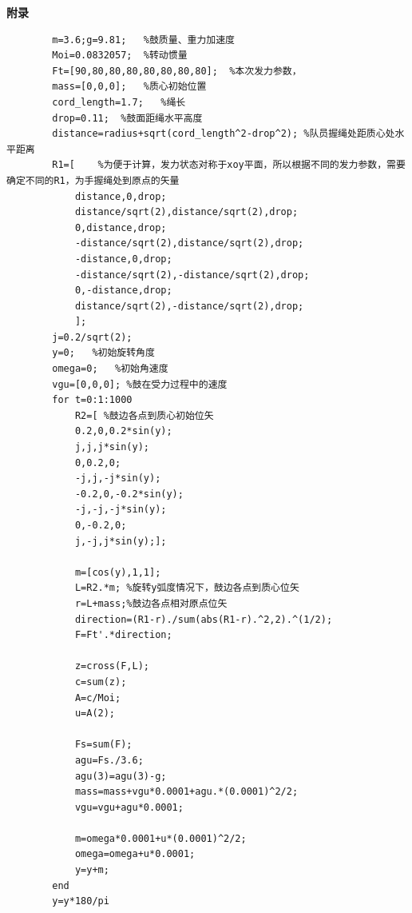 \documentclass[UTF8]{article}
\begin{document}
\newpage
\begin{appendices}
\centerline{{\LARGE\bfseries 附录}}

\centerline{\songti{}}
    \begin{verbatim}
        m=3.6;g=9.81;   %鼓质量、重力加速度
        Moi=0.0832057;  %转动惯量
        Ft=[90,80,80,80,80,80,80,80];  %本次发力参数，
        mass=[0,0,0];   %质心初始位置
        cord_length=1.7;   %绳长
        drop=0.11;  %鼓面距绳水平高度
        distance=radius+sqrt(cord_length^2-drop^2); %队员握绳处距质心处水平距离
        R1=[    %为便于计算，发力状态对称于xoy平面，所以根据不同的发力参数，需要确定不同的R1，为手握绳处到原点的矢量
            distance,0,drop;
            distance/sqrt(2),distance/sqrt(2),drop;
            0,distance,drop;
            -distance/sqrt(2),distance/sqrt(2),drop;
            -distance,0,drop;
            -distance/sqrt(2),-distance/sqrt(2),drop;
            0,-distance,drop;
            distance/sqrt(2),-distance/sqrt(2),drop;
            ];
        j=0.2/sqrt(2);
        y=0;   %初始旋转角度
        omega=0;   %初始角速度
        vgu=[0,0,0]; %鼓在受力过程中的速度
        for t=0:1:1000
            R2=[ %鼓边各点到质心初始位矢
            0.2,0,0.2*sin(y);
            j,j,j*sin(y);
            0,0.2,0;
            -j,j,-j*sin(y);
            -0.2,0,-0.2*sin(y);
            -j,-j,-j*sin(y);
            0,-0.2,0;
            j,-j,j*sin(y);];
        
            m=[cos(y),1,1];
            L=R2.*m; %旋转y弧度情况下，鼓边各点到质心位矢
            r=L+mass;%鼓边各点相对原点位矢
            direction=(R1-r)./sum(abs(R1-r).^2,2).^(1/2);
            F=Ft'.*direction;
            
            z=cross(F,L);
            c=sum(z);
            A=c/Moi;
            u=A(2);
        
            Fs=sum(F);
            agu=Fs./3.6;
            agu(3)=agu(3)-g;
            mass=mass+vgu*0.0001+agu.*(0.0001)^2/2;
            vgu=vgu+agu*0.0001;
            
            m=omega*0.0001+u*(0.0001)^2/2;
            omega=omega+u*0.0001;
            y=y+m;
        end
        y=y*180/pi
      
    \end{verbatim}


\end{appendices}
\end{document}
